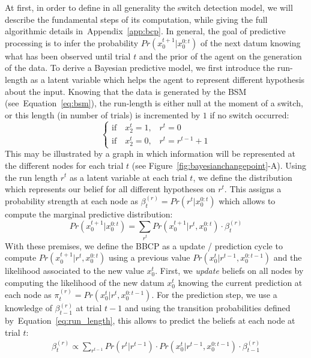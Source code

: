 \documentclass[12pt,english]{article}%
\newcommand{\choice}[1]{ %
	\left\{ %
		\begin{array}{l} #1 \end{array} %
	\right. }
\newcommand{\eql}[1]{\begin{equation}#1\end{equation}}
\newcommand{\eqa}[1]{\begin{align}#1\end{align}}
\newcommand{\seeFig}[1]{Figure~\ref{fig:#1}}
\newcommand{\seeEq}[1]{Equation~\ref{eq:#1}}
\newcommand{\seeApp}[1]{Appendix~\ref{app:#1}}
\begin{document}
At first, in order to define in all generality the switch detection model,
we will describe the fundamental steps of its computation,
while giving the full algorithmic details in~\seeApp{bcp}.
In general, the goal of predictive processing
is to infer the probability $Pr(x_0^{t+1} | x_0^{0:t})$ of the next datum
knowing what has been observed until trial $t$ and
the prior of the agent on the generation of the data.
To derive a Bayesian predictive model, we first introduce
the run-length as a latent variable which helps the agent to represent
different hypothesis about the input.
Knowing that the data is generated by the BSM (see~\seeEq{bsm}),
the run-length is either null at the moment of a switch,
or this length (in number of trials) is incremented by $1$ if no switch occurred:
\eql{\choice{
\text{if} \quad x_2^t=1 \text{,} \quad r^t = 0\\
\text{if} \quad x_2^t=0 \text{,} \quad r^t = r^{t-1} +1 }\label{eq:run_length}}%
This may be illustrated by a graph
in which information will be represented at the different nodes for each trial $t$ (see \seeFig{bayesianchangepoint}-A).
Using the run length $r^t$ as a latent variable at each trial $t$,
we define the distribution which represents our belief
for all different hypotheses on $r^t$.
This assigns a probability strength at each node
as $\beta^{(r)}_t=Pr(r^t | x_0^{0:t})$
which allows to compute the marginal predictive distribution:
\eql{
Pr(x_0^{t+1} | x_0^{0:t}) = \sum_{r^{t}} Pr(x_0^{t+1} | r^{t}, x_0^{0:t}) \cdot \beta^{(r)}_t %
\label{eq:pred}
}
With these premises, we define the BBCP
as a update / prediction cycle
to compute $Pr(x_0^{t+1} | r^{t}, x_0^{0:t})$ using
a previous value $Pr(x_0^{t} | r^{t-1}, x_0^{0:t-1})$ 
and the likelihood associated to the new value $x_0^t$.
First, we \emph{update} beliefs on all nodes
by computing the likelihood of the new datum $x_0^t$ 
knowing the current prediction at each node
as $\pi^{(r)}_t=Pr(x_0^t | r^{t}, x_0^{0:t-1})$.
For the prediction step, we use a knowledge of $\beta^{(r)}_{t-1}$ at trial $t-1$ and
using the transition probabilities defined by~\seeEq{run_length},
this allows to predict the beliefs at each node at trial $t$:
\eqa{
\beta^{(r)}_t \propto \sum_{r^{t-1}}  Pr(r^t | r^{t-1}) \cdot  Pr(x_0^t | r^{t-1}, x_0^{0:t-1}) \cdot  \beta^{(r)}_{t-1}
\label{eq:pred_node}
}
\end{document}

